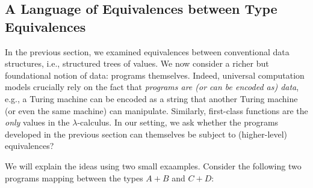 \begin{center}
\scalebox{1.6}{
}
\end{center}

\subsection{A Language of Equivalences between Type Equivalences}
\label{langeqeq}

In the previous section, we examined equivalences between conventional data structures, i.e., structured trees of
values. We now consider a richer but foundational notion of data: programs themselves. Indeed, universal computation
models crucially rely on the fact that \emph{programs are (or can be encoded as) data}, e.g., a Turing machine can be
encoded as a string that another Turing machine (or even the same machine) can manipulate. Similarly, first-class
functions are the \emph{only} values in the $\lambda$-calculus.  In our setting, we ask whether the programs developed
in the previous section can themselves be subject to (higher-level) equivalences?

We will explain the ideas using two small exaamples. Consider the following two programs mapping between the types
$A + B$ and $C+D$:

